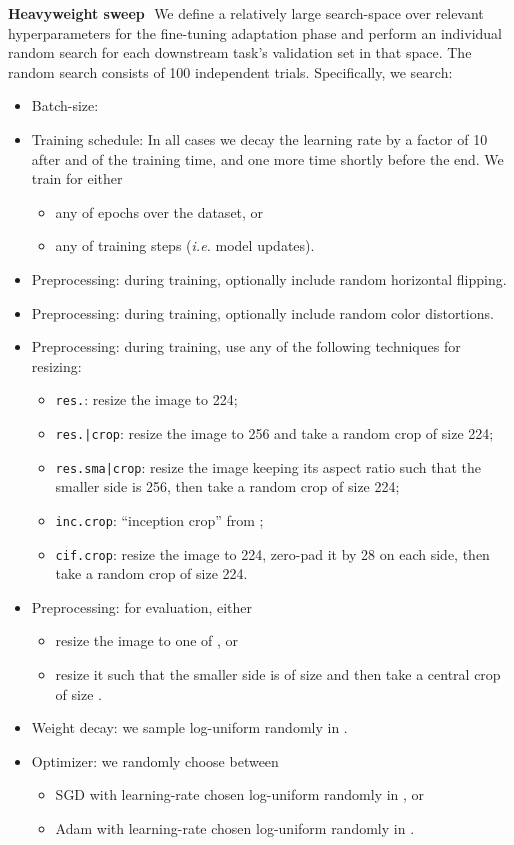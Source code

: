 \documentclass{article}
\renewcommand{\paragraph}[1]{{\bf #1}\,\,}
\begin{document}
\paragraph{Heavyweight sweep}
We define a relatively large search-space over relevant hyperparameters for the fine-tuning adaptation phase and perform an individual random search for each downstream task's validation set in that space.
The random search consists of 100 independent trials.
Specifically, we search:
\begin{itemize}
    \item Batch-size: 
    \item Training schedule: In all cases we decay the learning rate by a factor of 10 after  and  of the training time, and one more time shortly before the end. We train for either
    \begin{itemize}
        \item any of  epochs over the dataset, or
        \item any of  training steps (\emph{i.e.} model updates).
    \end{itemize}
    \item Preprocessing: during training, optionally include random horizontal flipping.
    \item Preprocessing: during training, optionally include random color distortions.
    \item Preprocessing: during training, use any of the following techniques for resizing:
    \begin{itemize}
        \item \texttt{res.}: resize the image to 224;
        \item \texttt{res.|crop}: resize the image to 256 and take a random crop of size 224;
        \item \texttt{res.sma|crop}: resize the image keeping its aspect ratio such that the smaller side is 256, then take a random crop of size 224;
        \item \texttt{inc.crop}: ``inception crop'' from \cite{szegedy2015going};
        \item \texttt{cif.crop}: resize the image to 224, zero-pad it by 28 on each side, then take a random crop of size 224.
    \end{itemize}
    \item Preprocessing: for evaluation, either
    \begin{itemize}
        \item resize the image to one of , or
        \item resize it such that the smaller side is of size  and then take a central crop of size .
    \end{itemize}
    \item Weight decay: we sample log-uniform randomly in .
    \item Optimizer: we randomly choose between
    \begin{itemize}
        \item SGD with learning-rate chosen log-uniform randomly in , or
        \item Adam with learning-rate chosen log-uniform randomly in .
    \end{itemize}
\end{itemize}
\end{document}
